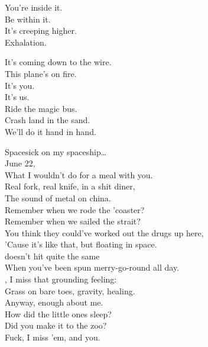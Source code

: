 You're inside it. \\
Be within it. \\
It's creeping higher. \\
Exhalation. \\


It's coming down to the wire. \\
This plane's on fire. \\
It's you. \\
It's us. \\
Ride the magic bus. \\
Crash land in the sand. \\
We'll do it hand in hand. \\





Spacesick on my spaceship… \\

June 22, \\
What I wouldn't do for a meal with you. \\
Real fork, real knife, in a shit diner, \\
The sound of metal on china. \\
Remember when we rode the 'coaster? \\
Remember when we sailed the strait? \\
You think they could've worked out the drugs up here, \\
'Cause it's like that, but floating in space. \\

 doesn't hit quite the same \\
When you've been spun merry-go-round all day. \\
, I miss that grounding feeling: \\
Grass on bare toes, gravity, healing. \\
Anyway, enough about me. \\
How did the little ones sleep? \\
Did you make it to the zoo? \\
Fuck, I miss 'em, and you. \\

